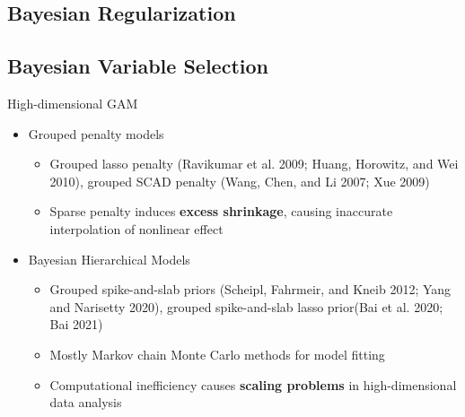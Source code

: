\documentclass[
  ignorenonframetext,
  aspectratio=169]{beamer}
\providecommand{\tightlist}{%
  \setlength{\itemsep}{0pt}\setlength{\parskip}{0pt}}
\begin{document}
\hypertarget{bayesian-regularization}{%
\subsection{Bayesian Regularization}\label{bayesian-regularization}}

\hypertarget{bayesian-variable-selection}{%
\subsection{Bayesian Variable
Selection}\label{bayesian-variable-selection}}

\begin{frame}{High-dimensional GAM}
\protect\hypertarget{high-dimensional-gam}{}
\begin{itemize}
\tightlist
\item
  Grouped penalty models

  \begin{itemize}
  \tightlist
  \item
    Grouped lasso penalty (Ravikumar et al. 2009; Huang, Horowitz, and
    Wei 2010), grouped SCAD penalty (Wang, Chen, and Li 2007; Xue 2009)
  \item
    Sparse penalty induces \textbf{excess shrinkage}, causing inaccurate
    interpolation of nonlinear effect
  \end{itemize}
\item
  Bayesian Hierarchical Models

  \begin{itemize}
  \tightlist
  \item
    Grouped spike-and-slab priors (Scheipl, Fahrmeir, and Kneib 2012;
    Yang and Narisetty 2020), grouped spike-and-slab lasso prior(Bai et
    al. 2020; Bai 2021)
  \item
    Mostly Markov chain Monte Carlo methods for model fitting
  \item
    Computational inefficiency causes \textbf{scaling problems} in
    high-dimensional data analysis
  \end{itemize}
\end{itemize}
\end{frame}
\end{document}
